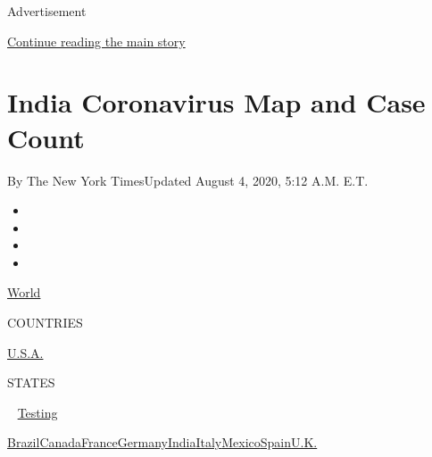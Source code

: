 Advertisement

\protect\hyperlink{after-top}{Continue reading the main story}

\hypertarget{india-coronavirus-map-and-case-count}{%
\section{India Coronavirus Map and Case
Count}\label{india-coronavirus-map-and-case-count}}

By The New York TimesUpdated August 4, 2020, 5:12 A.M. E.T.

\begin{itemize}
\item
\item
\item
\item
\end{itemize}

\href{https://www.nytimes3xbfgragh.onion/interactive/2020/world/coronavirus-maps.html}{World}~

COUNTRIES

\textbar{}
\href{https://www.nytimes3xbfgragh.onion/interactive/2020/us/coronavirus-us-cases.html}{U.S.A.}~

STATES

~
\href{https://www.nytimes3xbfgragh.onion/interactive/2020/us/coronavirus-testing.html}{Testing}

\href{https://www.nytimes3xbfgragh.onion/interactive/2020/world/americas/brazil-coronavirus-cases.html}{Brazil}\href{https://www.nytimes3xbfgragh.onion/interactive/2020/world/canada/canada-coronavirus-cases.html}{Canada}\href{https://www.nytimes3xbfgragh.onion/interactive/2020/world/europe/france-coronavirus-cases.html}{France}\href{https://www.nytimes3xbfgragh.onion/interactive/2020/world/europe/germany-coronavirus-cases.html}{Germany}\href{https://www.nytimes3xbfgragh.onion/interactive/2020/world/asia/india-coronavirus-cases.html}{India}\href{https://www.nytimes3xbfgragh.onion/interactive/2020/world/europe/italy-coronavirus-cases.html}{Italy}\href{https://www.nytimes3xbfgragh.onion/interactive/2020/world/americas/mexico-coronavirus-cases.html}{Mexico}\href{https://www.nytimes3xbfgragh.onion/interactive/2020/world/europe/spain-coronavirus-cases.html}{Spain}\href{https://www.nytimes3xbfgragh.onion/interactive/2020/world/europe/united-kingdom-coronavirus-cases.html}{U.K.}

